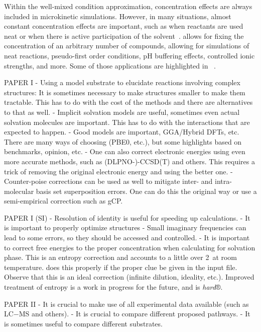 Within the well-mixed condition approximation,
concentration effects are always included in microkinetic simulations.
However,
in many situations,
almost constant concentration effects are important,
such as when reactants are used neat or when there is active participation of the solvent~\cite{Ryu_2018}.
\overreact allows for fixing the concentration of an arbitrary number of compounds,
allowing for simulations of neat reactions,
pseudo-first order conditions,
pH buffering effects,
controlled ionic strengths,
and more.
Some of those applications are highlighted in \citeauthor{Schneider_2022}~\cite{Schneider_2022}.

\clearpage


PAPER I
- Using a model substrate to elucidate reactions involving complex structures:
It is sometimes necessary to make structures smaller to make them tractable.
This has to do with the cost of the methods and there are alternatives to that as well.
- Implicit solvation models are useful,
sometimes even actual solvation molecules are important.
This has to do with the interactions that are expected to happen.
- Good models are important,
GGA/Hybrid DFTs,
etc.
There are many ways of choosing (PBE0,
etc.),
but some highlights based on benchmarks,
opinion,
etc.
- One can also correct electronic energies using even more accurate methods,
such as (DLPNO-)-CCSD(T) and others.
This requires a trick of removing the original electronic energy and using the better one.
- Counter-poise corrections can be used as well to mitigate inter- and intra-molecular basis set superposition errors.
One can do this the original way or use a semi-empirical correction such as gCP.\@

PAPER I (SI)
- Resolution of identity is useful for speeding up calculations.
- It is important to properly optimize structures
- Small imaginary frequencies can lead to some errors,
so they should be accessed and controlled.
- It is important to correct free energies to the proper
concentration when calculating for solvation phase.
This is an entropy correction and accounts to
a little over 2~\kcalmol at room temperature.
\overreact{} does this properly if the proper clue be
given in the input file.
Observe that this is an ideal correction (infinite dilution,
ideality,
etc.).
Improved treatment of entropy is a work in progress for the future,
and is \emph{hard}®.

PAPER II
- It is crucial to make use of all experimental data available (such as LC−MS and others).
- It is crucial to compare different proposed pathways.
- It is sometimes useful to compare different substrates.

